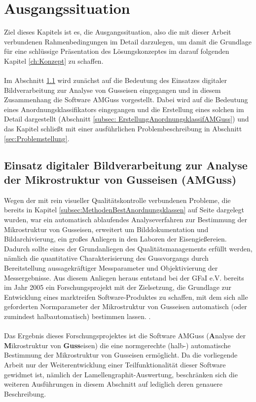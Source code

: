 \documentclass[
fontsize=10pt, 
listof = totoc,
parskip = half	
]{report}
\begin{document}
\chapter{Ausgangssituation}
\label{ch:Ausgangssituation}
Ziel dieses Kapitels ist es, die Ausgangssituation, also die mit dieser Arbeit verbundenen Rahmenbedingungen im Detail darzulegen, um damit die Grundlage für eine schlüssige Präsentation des Lösungskonzeptes im darauf folgenden Kapitel \ref{ch:Konzept} zu schaffen.
\\\\
Im Abschnitt \ref{sec:BestimmungMikrostrukturAMGuss} wird zunächst auf die Bedeutung des Einsatzes digitaler Bildverarbeitung zur Analyse von Gusseisen eingegangen und in diesem Zusammenhang die Software AMGuss vorgestellt. Dabei wird auf die Bedeutung eines Anordnungsklassifikators eingegangen und die Erstellung eines solchen im Detail dargestellt (Abschnitt \ref{subsec: ErstellungAnordnungsklassifAMGuss}) und das Kapitel schließt mit einer ausführlichen Problembeschreibung in Abschnitt \ref{sec:Problemstellung}.

\section{Einsatz digitaler Bildverarbeitung zur Analyse der Mikrostruktur von Gusseisen (AMGuss)}
\label{sec:BestimmungMikrostrukturAMGuss}
Wegen der mit rein visueller Qualitätskontrolle verbundenen Probleme, die bereits in Kapitel \ref{subsec:MethodenBestAnordnungsklassen} auf Seite \pageref{subsec:MethodenBestAnordnungsklassen} dargelegt wurden, war ein automatisch ablaufendes Analyseverfahren zur Bestimmung der Mikrostruktur von Gusseisen, erweitert um Bilddokumentation und Bildarchivierung, ein großes Anliegen in den Laboren der Eisengießereien. Dadurch sollte eines der Grundanliegen des Qualitätsmanagements erfüllt werden, nämlich die quantitative Charakterisierung des Gussvorgangs durch Bereitstellung aussagekräftiger Messparameter und Objektivierung der Messergebnisse. Aus diesem Anliegen heraus entstand bei der GFaI e.V. bereits im Jahr 2005 ein Forschungsprojekt mit der Zielsetzung, die Grundlage zur Entwicklung eines marktreifen Software-Produktes zu schaffen, mit dem sich alle geforderten Normparameter der Mikrostruktur von Gusseisen automatisch (oder zumindest halbautomatisch) bestimmen lassen. \cite{AMGuss2007}.
\\\\
Das Ergebnis dieses Forschungsprojektes ist die Software AMGuss (\textbf{A}nalyse der \textbf{M}ikrostruktur von \textbf{Guss}eisen) die eine normgerechte (halb-) automatische Bestimmung der Mikrostruktur von Gusseisen ermöglicht. Da die vorliegende Arbeit nur der Weiterentwicklung einer Teilfunktionalität dieser Software gewidmet ist, nämlich der Lamellengraphit-Auswertung, beschränken sich die weiteren Ausführungen in diesem Abschnitt auf lediglich deren genauere Beschreibung. 
\end{document}
